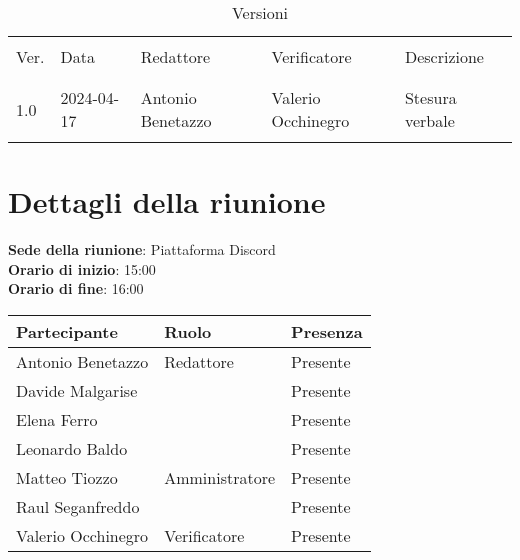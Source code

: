 \documentclass[italian,12pt]{article}
\begin{document}


\newpage



\begin{table}[!h]
	\caption{Versioni}
	\footnotesize
	\begin{center}
		\begin{tabular}{ l l l l l }
			\hline                                                                       \\[-2ex]
			Ver. & Data       & Redattore         & Verificatore       & Descrizione     \\
			\\[-2ex] \hline \\[-1.5ex]
			1.0  & 2024-04-17 & Antonio Benetazzo & Valerio Occhinegro & Stesura verbale \\
			\\[-1.5ex] \hline
		\end{tabular}
	\end{center}
\end{table}

\newpage

\tableofcontents

\newpage

\section{Dettagli della riunione}


\textbf{Sede della riunione}: Piattaforma Discord\\
\textbf{Orario di inizio}: 15:00\\
\textbf{Orario di fine}: 16:00\\


\begin{flushleft}
	\begin{table}[!h]
		\begin{tabular}{ |l|l|l| }
			\hline
			\textbf{Partecipante} & \textbf{Ruolo} & \textbf{Presenza} \\
			\hline
			Antonio Benetazzo     & Redattore      & Presente          \\
			Davide Malgarise      &                & Presente          \\
			Elena Ferro           &                & Presente          \\
			Leonardo Baldo        &                & Presente          \\
			Matteo Tiozzo         & Amministratore & Presente          \\
			Raul Seganfreddo      &                & Presente          \\
			Valerio Occhinegro    & Verificatore   & Presente          \\
			\hline
		\end{tabular}
	\end{table}
\end{flushleft}
\end{document}
